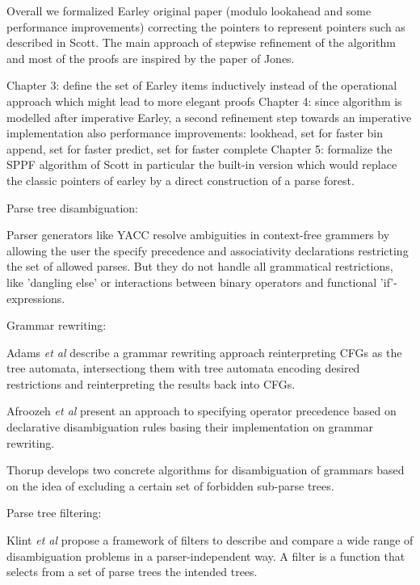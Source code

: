 \begin{isabellebody}
\begin{isamarkuptext}
Overall we formalized Earley original paper (modulo lookahead and some performance improvements) correcting
the pointers to represent pointers such as described in Scott. The main approach of stepwise refinement
of the algorithm and most of the proofs are inspired by the paper of Jones.%
\end{isamarkuptext}\isamarkuptrue%
%
\isadelimdocument
%
\endisadelimdocument
%
\isatagdocument
%
\isamarkuptrue%
%
\endisatagdocument
{\isafolddocument}%
%
\isadelimdocument
%
\endisadelimdocument
%
\begin{isamarkuptext}%
Chapter 3: define the set of Earley items inductively instead of the operational approach which might lead to more elegant proofs
Chapter 4: since algorithm is modelled after imperative Earley, a second refinement step towards an imperative implementation
  also performance improvements: lookhead, set for faster bin append, set for faster predict, set for faster complete
Chapter 5: formalize the SPPF algorithm of Scott in particular the built-in version which would replace
  the classic pointers of earley by a direct construction of a parse forest.%
\end{isamarkuptext}\isamarkuptrue%
%
\begin{isamarkuptext}%
Parse tree disambiguation:

Parser generators like YACC resolve ambiguities in context-free grammers by allowing the user
the specify precedence and associativity declarations restricting the set of allowed parses. But they
do not handle all grammatical restrictions, like 'dangling else' or interactions between binary operators
and functional 'if'-expressions.

Grammar rewriting:

Adams \textit{et al} \cite{Adams:2017} describe a grammar rewriting approach reinterpreting CFGs as
the tree automata, intersectiong them with tree automata encoding desired restrictions and reinterpreting
the results back into CFGs.

Afroozeh \textit{et al} \cite{Afroozeh:2013} present an approach to specifying operator precedence
based on declarative disambiguation rules basing their implementation on grammar rewriting.

Thorup \cite{Thorup:1996} develops two concrete algorithms for disambiguation of grammars based on the idea of 
excluding a certain set of forbidden sub-parse trees.

Parse tree filtering:

Klint \textit{et al} \cite{Klint:1997} propose a framework of filters to describe and compare a wide
range of disambiguation problems in a parser-independent way. A filter is a function that selects
from a set of parse trees the intended trees.%
\end{isamarkuptext}\isamarkuptrue%
%
\isadelimtheory
%
\endisadelimtheory
%
\isatagtheory
%
\endisatagtheory
{\isafoldtheory}%
%
\isadelimtheory
%
\endisadelimtheory
%
\end{isabellebody}%
